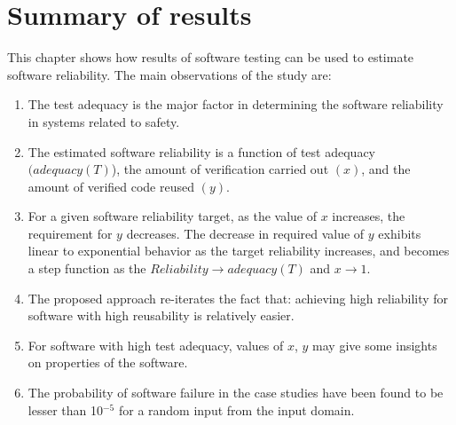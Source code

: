 \section{Summary of results}
This chapter shows how results of software testing can be used to estimate software reliability.
The main observations of the study are:
\begin{enumerate}
\item The test adequacy is the major factor in determining the software reliability in systems
related to safety.
\item The estimated software reliability is a function of test adequacy $(adequacy(T)$),
the amount of verification carried out $(x)$, and the amount of verified code reused $(y)$.
\item For a given software reliability target, as the value of $x$ increases, the requirement
for $y$ decreases. The decrease in required value of $y$ exhibits
linear to exponential behavior as the target reliability increases,
and becomes a step function as the $Reliability \rightarrow adequacy(T)$ and
$x\rightarrow1$.
\item The proposed approach re-iterates the fact that: achieving high reliability
for software with high reusability is relatively easier.
\item For software with high test adequacy, values of $x$,
$y$ may give some insights on properties of the software.
\item The probability of software failure in the case studies have been found to be lesser than 10$^{-5}$ for a random input from the input domain.
\end{enumerate}

